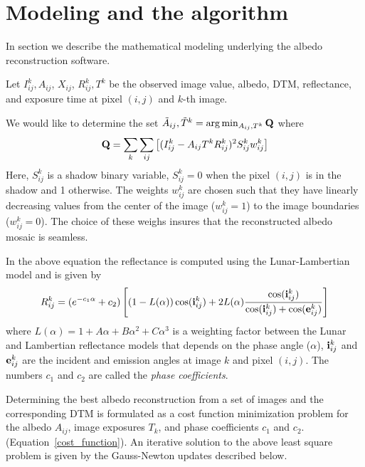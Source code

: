 \documentclass[letterpaper,fleqn,11pt]{report}
\begin{document}
\section{Modeling and the algorithm}\label{algorithm}

In section we describe the mathematical modeling underlying the albedo reconstruction software.

Let $I^k_{ij}, A_{ij}$, $X_{ij}$, $R^k_{ij}, T^k$ be the observed image value, albedo, DTM, reflectance, and exposure time at pixel $(i,j)$ and $k$-th image.

We would like to determine the set ${\tilde{A}_{ij}, \tilde{T}^k} = \arg \min_{A_{ij}, T^k} {\bf Q}$  where
\begin{eqnarray}
{\bf Q} = \sum_k\sum_{ij}\left[(I^k_{ij}-A_{ij}T^kR^k_{ij})^2 S^k_{ij}w^k_{ij}\right]
\label{cost_function}
\end {eqnarray}
Here,  $S^k_{ij}$ is a shadow binary variable, $S^k_{ij} =
0$ when the pixel $(i, j)$ is in the shadow and 1 otherwise. The weights
$w^k_{ij}$ are chosen such that they have linearly decreasing values
from the center of the image ($w^k_{ij} = 1$) to the image boundaries
($w^k_{ij} = 0$). The choice of these weighs insures that the
reconstructed albedo mosaic is seamless. 

In the above equation the reflectance is computed using the Lunar-Lambertian model and is given by
\begin{eqnarray}
R^k_{ij} = (e^{-c_1\alpha} + c_2)\left[ (1-L(\alpha))\cos({\bf i}_{ij}^k)
  +2L(\alpha)\frac{\cos({\bf i}_{ij}^k)}{\cos({\bf i}_{ij}^k) +
    \cos({\bf e}_{ij}^k)} \right]
\label{reflectance}
\end {eqnarray}
where $L(\alpha) = 1 + A\alpha + B\alpha^2 + C\alpha^3$ is a weighting factor between the Lunar and Lambertian reflectance models that depends on the phase angle ($\alpha$), ${\bf i}_{ij}^k$ and ${\bf e}_{ij}^k$
are the incident and emission angles at image $k$ and pixel $(i,j)$. The
numbers $c_1$ and $c_2$ are called the {\it phase coefficients}.

Determining the best albedo reconstruction from a set of images and
the corresponding DTM is formulated as a cost function minimization
problem for the albedo $A_{ij}$, image exposures $T_k$, and phase
coefficients $c_1$ and $c_2.$ (Equation~\ref{cost_function}). An iterative solution to the above least square problem is given by the Gauss-Newton updates described below. 
\end{document}
